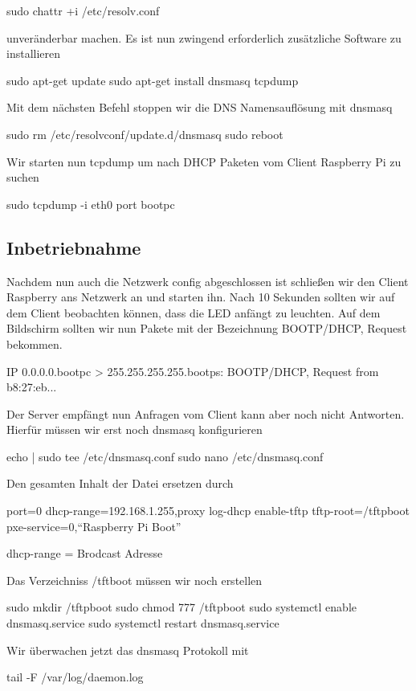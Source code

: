 \documentclass[a4paper,10pt] {article}
\begin{document}
			sudo chattr +i /etc/resolv.conf
			
			unveränderbar machen. Es ist nun zwingend erforderlich zusätzliche Software zu installieren 
			
			sudo apt-get update
			sudo apt-get install dnsmasq tcpdump
			
			Mit dem nächsten Befehl stoppen wir die DNS Namensauflösung mit dnsmasq 
			
			sudo rm /etc/resolvconf/update.d/dnsmasq
			sudo reboot
			
			Wir starten nun tcpdump um nach DHCP Paketen vom Client Raspberry Pi zu suchen
			
			sudo tcpdump -i eth0 port bootpc
						
		\vfill
		
		\subsection{Inbetriebnahme}
			
			Nachdem nun auch die Netzwerk config abgeschlossen ist schließen wir den Client Raspberry ans Netzwerk an und starten ihn. Nach 10 Sekunden sollten wir auf dem Client beobachten können, dass die LED anfängt zu leuchten. Auf dem Bildschirm sollten wir nun Pakete mit der Bezeichnung BOOTP/DHCP, Request bekommen.
			
			IP 0.0.0.0.bootpc > 255.255.255.255.bootps: BOOTP/DHCP, Request from b8:27:eb...
		
			Der Server empfängt nun Anfragen vom Client kann aber noch nicht Antworten. Hierfür müssen wir erst noch dnsmasq konfigurieren
			
			echo | sudo tee /etc/dnsmasq.conf
			sudo nano /etc/dnsmasq.conf
			
			Den gesamten Inhalt der Datei ersetzen durch
			
			port=0
			dhcp-range=192.168.1.255,proxy
			log-dhcp
			enable-tftp
			tftp-root=/tftpboot
			pxe-service=0,``Raspberry Pi Boot''
			
			dhcp-range = Brodcast Adresse
			
			Das Verzeichniss /tftboot müssen wir noch erstellen
			
			sudo mkdir /tftpboot
			sudo chmod 777 /tftpboot
			sudo systemctl enable dnsmasq.service
			sudo systemctl restart dnsmasq.service
			
			Wir überwachen jetzt das dnsmasq Protokoll mit 
			
			tail -F /var/log/daemon.log
			
\end{document}
